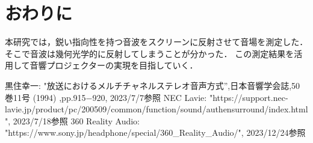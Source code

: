 \documentclass[twocolumn,10pt,a4j]{ltjsarticle}
\begin{document}
\vspace{1ex}
\section{おわりに}
本研究では，鋭い指向性を持つ音波をスクリーンに反射させて音場を測定した．
そこで音波は幾何光学的に反射してしまうことが分かった．
この測定結果を活用して音響プロジェクターの実現を目指していく．

\begin{thebibliography}{99}
 黒住幸一: "放送におけるメルチチャネルステレオ音声方式'',日本音響学会誌,50巻11号 (1994) ,pp.915−920, 2023/7/7参照
 NEC Lavie: "https://support.nec-lavie.jp/product/pc/200509/common/function/sound/authensurround/index.html", 2023/7/18参照
 360 Reality Audio: "https://www.sony.jp/headphone/special/360\_Reality\_Audio/", 2023/12/24参照

\end{thebibliography}
\end{document}
